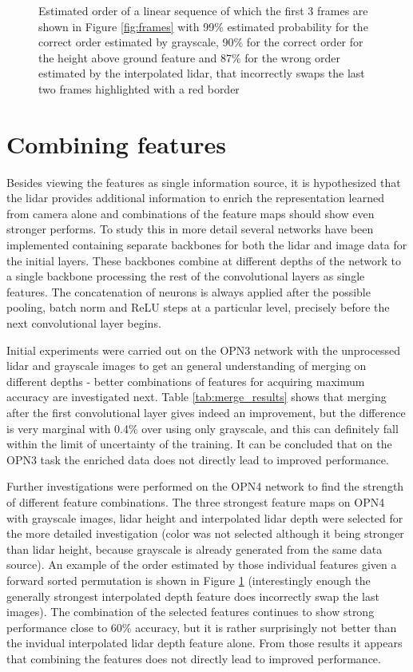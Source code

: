 \begin{figure}[t!]
\caption{Estimated order of a linear sequence of which the first 3 frames are shown in Figure \ref{fig:frames} with 99\% estimated probability for the correct order estimated by grayscale, 90\% for the correct order for the height above ground feature and 87\% for the wrong order estimated by the interpolated lidar, that incorrectly swaps the last two frames highlighted with a red border}
\label{fig:orderings}
\end{figure}

\section{Combining features}
Besides viewing the features as single information source, it is hypothesized that the lidar provides additional information to enrich the representation learned from camera alone and combinations of the feature maps should show even stronger performs. To study this in more detail several networks have been implemented containing separate backbones for both the lidar and image data for the initial layers. These backbones combine at different depths of the network to a single backbone processing the rest of the convolutional layers as single features. The concatenation of neurons is always applied after the possible pooling, batch norm and ReLU steps at a particular level, precisely before the next convolutional layer begins.

Initial experiments were carried out on the OPN3 network with the unprocessed lidar and grayscale images to get an general understanding of merging on different depths - better combinations of features for acquiring maximum accuracy are investigated next. Table \ref{tab:merge_results} shows that merging after the first convolutional layer gives indeed an improvement, but the difference is very marginal with 0.4\% over using only grayscale, and this can definitely fall within the limit of uncertainty of the training. It can be concluded that on the OPN3 task the enriched data does not directly lead to improved performance. 

Further investigations were performed on the OPN4 network to find the strength of different feature combinations. The three strongest feature maps on OPN4 with grayscale images, lidar height and interpolated lidar depth were selected for the more detailed investigation (color was not selected although it being stronger than lidar height, because grayscale is already generated from the same data source). An example of the order estimated by those individual features given a forward sorted permutation is shown in Figure \ref{fig:orderings} (interestingly enough the generally strongest interpolated depth feature does incorrectly swap the last images). The combination of the selected features continues to show strong performance close to 60\% accuracy, but it is rather surprisingly not better than the invidual interpolated lidar depth feature alone. From those results it appears that combining the features does not directly lead to improved performance. 

